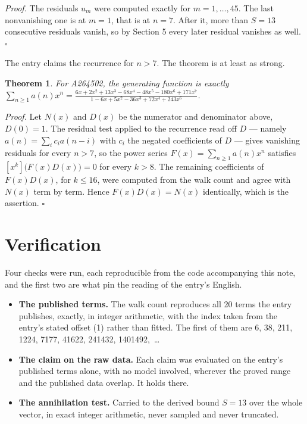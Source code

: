 \documentclass[11pt]{article}
\newtheorem{theorem}{Theorem}
\theoremstyle{definition}
\begin{document}
{\itshape Proof.} The residuals $u_m$ were computed exactly for $m = 1,\dots,45$. The last nonvanishing one is at $m = 1$, that is at $n = 7$. After it, more than $S = 13$ consecutive residuals vanish, so by Section 5 every later residual vanishes as well. $\square$

The entry claims the recurrence for $n > 7$. The theorem is at least as strong.

\begin{theorem} For A264502, the generating function is exactly $\sum_{n\ge 1} a(n)x^n = \frac{6x + 2x^{2} + 13x^{3} - 68x^{4} - 48x^{5} - 180x^{6} + 171x^{7}}{1 - 6x + 5x^{2} - 36x^{3} + 72x^{4} + 243x^{6}}$.\end{theorem}

{\itshape Proof.} Let $N(x)$ and $D(x)$ be the numerator and denominator above, $D(0)=1$. The residual test applied to the recurrence read off $D$ --- namely $a(n) = \sum_i c_i a(n-i)$ with $c_i$ the negated coefficients of $D$ --- gives vanishing residuals for every $n > 7$, so the power series $F(x)=\sum_{n\ge 1}a(n)x^n$ satisfies $[x^k]\bigl(F(x)D(x)\bigr) = 0$ for every $k > 8$. The remaining coefficients of $F(x)D(x)$, for $k \le 16$, were computed from the walk count and agree with $N(x)$ term by term. Hence $F(x)D(x) = N(x)$ identically, which is the assertion. $\square$

\section{Verification}

Four checks were run, each reproducible from the code accompanying this note, and the first two are what pin the reading of the entry's English.

\begin{itemize}

\item {\bfseries The published terms.} The walk count reproduces all 20 terms the entry publishes, exactly, in integer arithmetic, with the index taken from the entry's stated offset (1) rather than fitted. The first of them are 6, 38, 211, 1224, 7177, 41622, 241432, 1401492,~\dots

\item {\bfseries The claim on the raw data.} Each claim was evaluated on the entry's published terms alone, with no model involved, wherever the proved range and the published data overlap. It holds there.

\item {\bfseries The annihilation test.} Carried to the derived bound $S = 13$ over the whole vector, in exact integer arithmetic, never sampled and never truncated.

\end{itemize}
\end{document}
